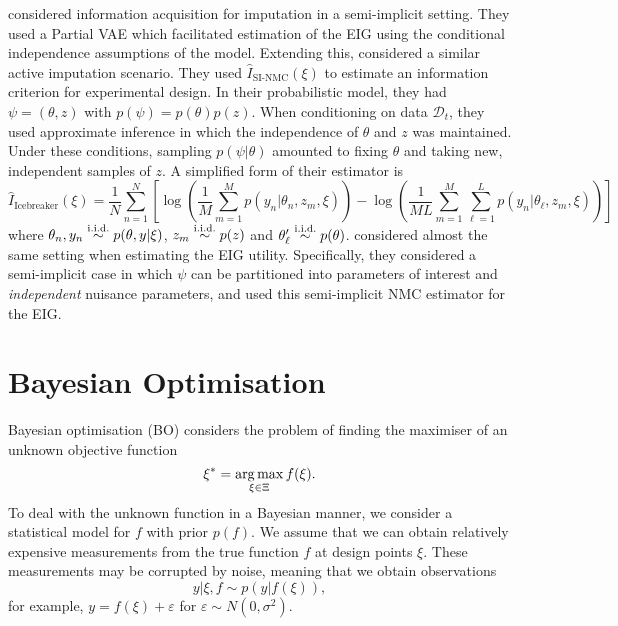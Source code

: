 \documentclass[a4paper, 10pt]{report}
\theoremstyle{plain}
\begin{document}
	
	\citet{ma2018eddi} considered information acquisition for imputation in a semi-implicit setting. They used a Partial VAE which facilitated estimation of the EIG using the conditional independence assumptions of the model.
	Extending this, \citet{gong2019icebreaker} considered a similar active imputation scenario. They used $\hat{I}_\text{SI-NMC}(\xi)$ to estimate an information criterion for experimental design.
	In their probabilistic model, they had $\psi = (\theta,z)$ with $p(\psi) = p(\theta)p(z)$.
	When conditioning on data $\mathcal{D}_t$, they used approximate inference in which the independence of $\theta$ and $z$ was maintained.
	Under these conditions, sampling $p(\psi|\theta)$ amounted to fixing $\theta$ and taking new, independent samples of $z$. A simplified form of their estimator is
	\begin{equation}
	\hat{I}_\text{Icebreaker}(\xi) = \frac{1}{N} \sum_{n=1}^N \left[ \log\left( \frac{1}{M} \sum_{m=1}^M p(y_n|\theta_n,z_m,\xi) \right) - \log \left( \frac{1}{ML}  \sum_{m=1}^M \sum_{\ell=1}^L p(y_n|\theta_\ell,z_m,\xi) \right)\right]
	\end{equation}
	where $\theta_n,y_n \overset{\scriptstyle{\text{i.i.d.}}}{\sim} p(\theta,y|\xi)$, $z_m \overset{\scriptstyle{\text{i.i.d.}}}{\sim} p(z)$ and $\theta'_\ell\overset{\scriptstyle{\text{i.i.d.}}}{\sim} p(\theta)$.
	\citet{overstall2017bayesian} considered almost the same setting when estimating the EIG utility. Specifically, they considered a semi-implicit case in which $\psi$ can be partitioned into parameters of interest and \emph{independent} nuisance parameters, and used this semi-implicit NMC estimator for the EIG.
	
	
	
	
	
	
	\section{Bayesian Optimisation}
	\label{sec:bo}
	
	Bayesian optimisation (BO) \citep{snoek2012practical,shahriari2015taking} considers the problem of finding the maximiser of an unknown objective function
	\begin{equation}
	\xi^* = \operatorname*{arg\,max}_{\xi\in\Xi} f(\xi).
	\end{equation}
	To deal with the unknown function in a Bayesian manner, we consider a statistical model for $f$ with prior $p(f)$.
	We assume that we can obtain relatively expensive measurements from the true function $f$ at design points $\xi$.
	These measurements may be corrupted by noise, meaning that we obtain observations
	\begin{equation}
	\label{eq:bo_likelihood}
	y|\xi,f \sim p(y|f(\xi)),
	\end{equation}
	for example, $y = f(\xi) + \varepsilon$ for $\varepsilon \sim N(0,\sigma^2)$.
	
\end{document}
